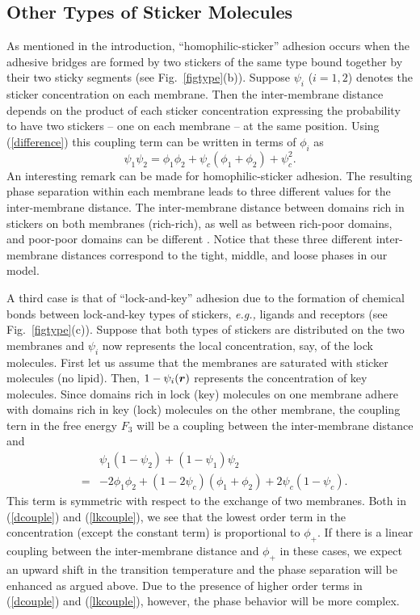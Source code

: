 \subsection{Other Types of Sticker Molecules}


As mentioned in the introduction, ``homophilic-sticker'' adhesion
occurs when the adhesive bridges are formed by two stickers of the
same type bound together by their two sticky segments (see Fig.\
\ref{figtype}(b)). Suppose $\psi_i$ ($i=1,2$) denotes the sticker
concentration on each membrane. Then the inter-membrane distance
depends on the product of each sticker concentration expressing
the probability to have two stickers -- one on each membrane -- at
the same position. Using (\ref{difference}) this coupling term can
be written in terms of $\phi_i$ as
\begin{equation}
\psi_1 \psi_2 = \phi_1 \phi_2 +\psi_c(\phi_1 +\phi_2)
+\psi_c^2.
\label{dcouple}
\end{equation}
%
An interesting remark can be made
for  homophilic-sticker adhesion. The resulting
phase separation within each membrane
leads to three different values for the inter-membrane distance.
The inter-membrane distance between domains rich in stickers
on both membranes
(rich-rich), as well as between rich-poor domains, and 
poor-poor domains can be different \cite{Lipowsky96,Lipowsky97}.
Notice that these three different inter-membrane distances correspond
to the tight, middle, and loose phases in our model.


A third case is that of ``lock-and-key'' adhesion due to the
formation of chemical bonds between lock-and-key types of
stickers, {\it e.g.,} ligands and receptors (see Fig.\
\ref{figtype}(c)). Suppose that both types of stickers are
distributed on the two membranes and $\psi_i$ now represents the
local concentration, say, of the lock molecules. First let us
assume that the membranes are saturated with sticker molecules (no
lipid). Then, $1-\psi_i(\mbox{\boldmath $r$})$ represents the
concentration of key molecules. Since domains rich in lock (key)
molecules on one membrane adhere with domains rich in key (lock)
molecules on the other membrane, the coupling tern in the free
energy $F_3$ will be a coupling between the inter-membrane
distance and
%
\begin{eqnarray}
& & \psi_1 (1-\psi_2)+(1-\psi_1)\psi_2  \nonumber  \\
& = & -2\phi_1 \phi_2 +(1-2\psi_c)(\phi_1+\phi_2)+2\psi_c(1-\psi_c).
\label{lkcouple}
\end{eqnarray}
%
This term is symmetric with respect to the exchange of two membranes.
Both in (\ref{dcouple}) and (\ref{lkcouple}), we see that the lowest order
term in the concentration (except the constant term) is proportional to
$\phi_+$.
If there is a linear coupling between the inter-membrane distance and
$\phi_+$ in these cases, we expect an upward shift in the transition
temperature and the phase separation will be enhanced as argued above.
Due to the presence of higher order terms in (\ref{dcouple}) and
(\ref{lkcouple}), however, the phase behavior 
will be more complex.


